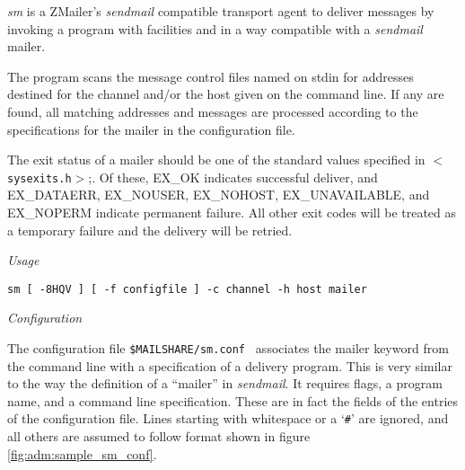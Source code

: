 
{\em sm} is a ZMailer's {\em sendmail} compatible transport agent to
deliver messages by invoking a program with facilities and in a way 
compatible with a {\em sendmail} mailer.

The program scans the message control files named on stdin
for addresses destined for the channel and/or the host
given on the command line. If any are found, all matching
addresses and messages are processed according to the
specifications for the mailer in the configuration file.

The exit status of a mailer should be one of the standard
values specified in {\tt {\(<\)}sysexits.h{\(>\)}};.
Of these, EX\_OK indicates successful deliver, and EX\_DATAERR,
EX\_NOUSER, EX\_NOHOST, EX\_UNAVAILABLE, and EX\_NOPERM indicate
permanent failure.
All other exit codes will be treated as a temporary failure
and the delivery will be retried.




{\em Usage}

{\tt sm [ -8HQV ] [ -f configfile ] -c channel -h host mailer}


{\em Configuration}

The configuration file {\tt \$MAILSHARE/sm.conf } associates
the mailer keyword from the command line with a specification
of a delivery program.
This is very similar to the way the definition of a ``mailer'' in
{\em sendmail}.
It requires flags, a program name, and a command line specification.
These are in fact the fields of the entries of the configuration file.
Lines starting with whitespace or a `{\tt \#}' are ignored, and all
others are assumed to follow format shown in figure
\vref{fig:adm:sample_sm_conf}.

